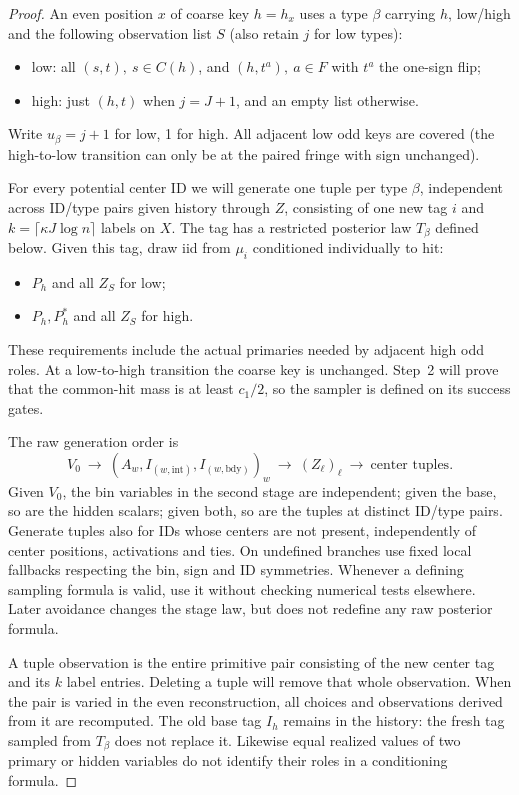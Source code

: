 \begin{proof}
An even position \(x\) of coarse key \(h=h_x\) uses a type \(\beta\) carrying \(h\), low/high and the following observation list \(S\) (also retain \(j\) for low types):
\begin{itemize}
\item low: all \((s,t),\ s\in C(h)\), and \((h,t^a),\ a\in F\) with \(t^a\) the one-sign flip;
\item high: just \((h,t)\) when \(j=J+1\), and an empty list otherwise.
\end{itemize}
Write \(u_\beta=j+1\) for low, 1 for high. All adjacent low odd keys are covered (the high-to-low transition can only be at the paired fringe with sign unchanged).

For every potential center ID we will generate one tuple per type \(\beta\), independent across ID/type pairs given history through \(Z\), consisting of one new tag \(i\) and \(k=\lceil\kappa J\log n\rceil\) labels on \(X\). The tag has a restricted posterior law \(T_\beta\) defined below. Given this tag, draw iid from \(\mu_i\) conditioned individually to hit:
\begin{itemize}
\item \(P_h\) and all \(Z_S\) for low;
\item \(P_h,P_h^*\) and all \(Z_S\) for high.
\end{itemize}
These requirements include the actual primaries needed by adjacent high
odd roles. At a low-to-high transition the coarse key is unchanged.
Step~2 will prove that the common-hit mass is at least \(c_1/2\), so the
sampler is defined on its success gates.

The raw generation order is
\[
 V_0\ \longrightarrow\ (A_w,I_{(w,\mathrm{int})},I_{(w,\mathrm{bdy})})_w
 \ \longrightarrow\ (Z_\ell)_\ell
 \ \longrightarrow\ \text{center tuples}.
\]
Given \(V_0\), the bin variables in the second stage are independent;
given the base, so are the hidden scalars; given both, so are the tuples
at distinct ID/type pairs. Generate tuples also for IDs whose centers are
not present, independently of center positions, activations and ties.
On undefined branches use fixed local fallbacks respecting the bin, sign
and ID symmetries. Whenever a defining sampling formula is valid, use it
without checking numerical tests elsewhere. Later avoidance changes the
stage law, but does not redefine any raw posterior formula.

A tuple observation is the entire primitive pair consisting of the new
center tag and its \(k\) label entries. Deleting a tuple will remove that
whole observation. When the pair is varied in the even reconstruction,
all choices and observations derived from it are recomputed. The old base
tag \(I_h\) remains in the history: the fresh tag sampled from
\(T_\beta\) does not replace it. Likewise equal realized values of two
primary or hidden variables do not identify their roles in a conditioning
formula.


\end{proof}
